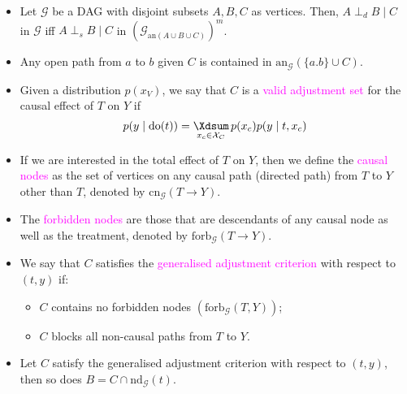 \documentclass[UTF8]{book}
\DeclareMathOperator*{\Xsum}{\mathchoice{\Xdsum}{\Xtsum}{\Xtsum}{\Xtsum}}
\newcommand{\concept}[1]{\textcolor{magenta}{#1}}
\begin{document}
\begin{itemize}
\item Let $\mathcal{G}$ be a DAG with disjoint subsets $A,B,C$ as vertices. Then, $A\perp_d B\mid C$ in $\mathcal{G}$ iff $A\perp_s B\mid C$ in $(\mathcal{G}_{\mathrm{an}(A\cup B\cup C)})^m$.
\item Any open path from $a$ to $b$ given $C$ is contained in $\mathrm{an}_\mathcal{G}(\{a.b\}\cup C)$.
\item Given a distribution $p(x_V)$, we say that $C$ is a \concept{valid adjustment set} for the causal effect of $T$ on $Y$ if
$$
p(y\mid \mathrm{do}(t)) = \Xsum_{x_c\in \mathcal{X}_C} p(x_c)p(y\mid t, x_c)
$$
\item If we are interested in the total effect of $T$ on $Y$, then we define the \concept{causal nodes} as the set of vertices on any causal path (directed path) from $T$ to $Y$ other than $T$, denoted by $\mathrm{cn}_\mathcal{G}(T\rightarrow Y)$.
\item The \concept{forbidden nodes} are those that are descendants of any causal node as well as the treatment, denoted by $\mathrm{forb}_\mathcal{G}(T\rightarrow Y)$.
\item We say that $C$ satisfies the \concept{generalised adjustment criterion} with respect to $(t,y)$ if:
\begin{itemize}
	\item $C$ contains no forbidden nodes $(\mathrm{forb}_\mathcal{G}(T,Y))$;
	\item $C$ blocks all non-causal paths from $T$ to $Y$.
\end{itemize}
\item Let $C$ satisfy the generalised adjustment criterion with respect to $(t,y)$, then so does $B = C\cap \mathrm{nd}_\mathcal{G}(t)$.
\end{itemize}
\end{document}
